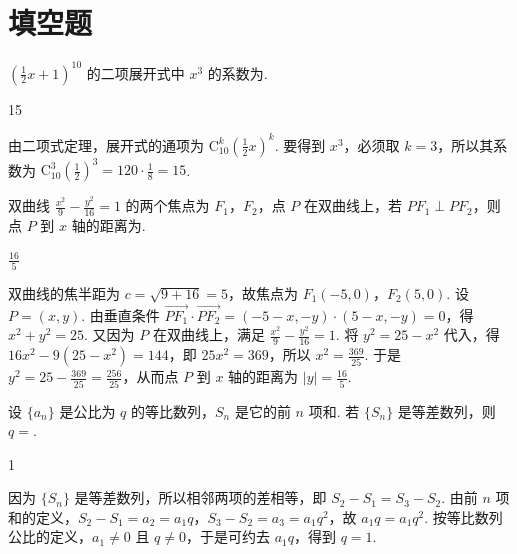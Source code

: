 \section{填空题}
\begin{problem}
\(\left(\frac{1}{2} x + 1\right)^{10}\) 的二项展开式中 \(x^{3}\) 的系数为\fillinblank{}.
\end{problem}

\begin{answer}
15
\end{answer}

\begin{solution}
由二项式定理，展开式的通项为 \(\mathrm C_{10}^{k}\left(\frac12x\right)^k\). 要得到 \(x^3\)，必须取 \(k=3\)，所以其系数为
\(\mathrm C_{10}^{3}\left(\frac12\right)^3=120\cdot\frac18=15\).
\end{solution}

\begin{problem}
双曲线 \( \frac{x^{2}}{9}-\frac{y^{2}}{16}=1 \) 的两个焦点为 \(F_{1}\)，\(F_{2}\)，点 \(P\) 在双曲线上，若 \( PF_{1} \perp PF_{2} \)，则点 \(P\) 到 \(x\) 轴的距离为\fillinblank{}.
\end{problem}

\begin{answer}
\(\frac{16}{5}\)
\end{answer}

\begin{solution}
双曲线的焦半距为 \(c=\sqrt{9+16}=5\)，故焦点为 \(F_1(-5,0)\)，\(F_2(5,0)\). 设 \(P=(x,y)\). 由垂直条件
\(\overrightarrow{PF_1}\cdot\overrightarrow{PF_2}=(-5-x,-y)\cdot(5-x,-y)=0\)，得 \(x^2+y^2=25\). 又因为 \(P\) 在双曲线上，满足 \(\frac{x^2}{9}-\frac{y^2}{16}=1\). 将 \(y^2=25-x^2\) 代入，得
\(16x^2-9(25-x^2)=144\)，即 \(25x^2=369\)，所以 \(x^2=\frac{369}{25}\). 于是
\(y^2=25-\frac{369}{25}=\frac{256}{25}\)，从而点 \(P\) 到 \(x\) 轴的距离为 \(|y|=\frac{16}{5}\).
\end{solution}

\begin{problem}
设 \(\{a_{n}\}\) 是公比为 \(q\) 的等比数列，\(S_{n}\) 是它的前 \(n\) 项和. 若 \(\{S_{n}\}\) 是等差数列，则 \(q = \)\fillinblank{}.
\end{problem}

\begin{answer}
1
\end{answer}

\begin{solution}
因为 \(\{S_n\}\) 是等差数列，所以相邻两项的差相等，即 \(S_2-S_1=S_3-S_2\). 由前 \(n\) 项和的定义，\(S_2-S_1=a_2=a_1q\)，\(S_3-S_2=a_3=a_1q^2\)，故
\(a_1q=a_1q^2\). 按等比数列公比的定义，\(a_1\ne0\) 且 \(q\ne0\)，于是可约去 \(a_1q\)，得到 \(q=1\).
\end{solution}

